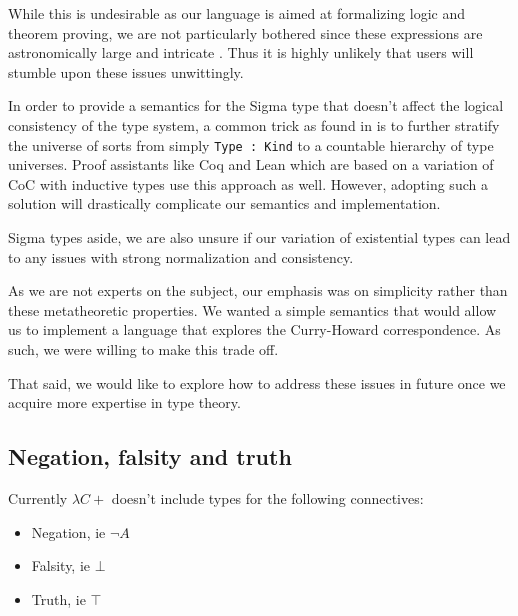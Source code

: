 \documentclass{article}
\begin{document}
While this is undesirable as our language is aimed at formalizing logic and
theorem proving, we are not particularly bothered since
these expressions are astronomically large and intricate
\cite{analysis_of_girard}. Thus it is highly unlikely that users will stumble
upon these issues unwittingly.


In order to provide a semantics for the Sigma type that doesn't affect the logical
consistency of the type system, a common trick as found in \cite{extended_coc}
is to further stratify the universe of sorts from simply \verb|Type : Kind| to 
a countable hierarchy of type universes.
Proof assistants like Coq and Lean which are based on a variation of CoC with
inductive types use this approach as well.
However, adopting such a solution will drastically complicate our semantics and
implementation. 

Sigma types aside, we are also unsure if our variation of existential types
can lead to any issues with strong normalization and consistency.

As we are not experts on the subject, our emphasis was on simplicity rather than
these metatheoretic properties.
We wanted a simple semantics that would allow us to implement a language that
explores the Curry-Howard correspondence.
As such, we were willing to make this trade off.

That said, we would like to explore how to address these issues in future once
we acquire more expertise in type theory.



\subsection{Negation, falsity and truth}
Currently $\lambda C+$ doesn't include types for the following connectives:
\begin{itemize}[label=$\ast$]
  \item Negation, ie $\neg A$
  \item Falsity, ie $\bot$
  \item Truth, ie $\top$ 
\end{itemize} 
\end{document}
